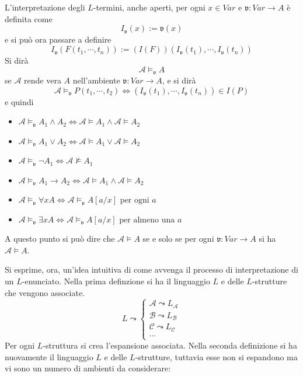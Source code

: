 \begin{defi}
        L'interpretazione degli $L$-termini, anche aperti, per ogni 
        $x \in Var$ e $\mathfrak{v} : Var \rightarrow A$ è 
        definita come 
        $$
        I_{\mathfrak{v}}(x) := \mathfrak{v}(x)
        $$
        e si può ora passare a definire 
        $$
        I_{\mathfrak{v}}(F(t_1, \cdots, t_n)) := (I(F))(I_{\mathfrak{v}}(t_1), \cdots, I_{\mathfrak{v}}(t_n))
        $$
        Si dirà
        $$
        \mathcal{A}\models_{\mathfrak{v}} A 
        $$
        se $\mathcal{A}$ rende vera $A$ nell'ambiente $\mathfrak{v}: Var \rightarrow A$, 
        e si dirà 
        $$
        \mathcal{A} \models_{\mathfrak{v}} P(t_1, \cdots, t_2) \iff (I_{\mathfrak{v}}(t_1), \cdots, I_{\mathfrak{v}}(t_n)) \in I(P)
        $$
         e quindi 

         \begin{itemize}
                 \item  $\mathcal{A} \models_{\mathfrak{v}} A_1 \land A_2 \iff \mathcal{A} \models A_1 \land \mathcal{A} \models A_2$
                 \item $\mathcal{A} \models_{\mathfrak{v}}A_1 \lor A_2 \iff \mathcal{A} \models A_1 \lor \mathcal{A} \models A_2$
                 \item $\mathcal{A} \models_{\mathfrak{v}}  \neg A_1  \iff \mathcal{A} \nvDash A_1 $
                 \item $\mathcal{A} \models_{\mathfrak{v}} A_1 \rightarrow A_2 \iff \mathcal{A} \models A_1 \land \mathcal{A} \models A_2$
                 \item $\mathcal{A} \models_{\mathfrak{v}} \forall x A \iff \mathcal{A} \models_{\mathfrak{v}} A[a/x] \text{ per ogni } a$
                 \item $\mathcal{A} \models_{\mathfrak{v}} \exists x A \iff \mathcal{A} \models_{\mathfrak{v}} A[a/x] \text{ per almeno una  } a$
        \end{itemize}
        A questo punto si  può dire che $\mathcal{A} \models A$ se e solo se 
        per ogni $\mathfrak{v}: Var \rightarrow A$ si ha $\mathcal{A} \models A$. 
\end{defi}

\noindent
Si esprime, ora, un'idea intuitiva di come avvenga il processo di interpretazione 
di un $L$-enunciato. Nella prima definzione si ha il linguaggio $L$ e delle 
$L$-strutture che vengono associate. 
$$
L 
\leadsto
\begin{cases}
        \mathcal{A}  \leadsto L_{\mathcal{A}} \\
        \mathcal{B}  \leadsto L_{\mathcal{B}} \\
        \mathcal{C}  \leadsto L_{\mathcal{C}} \\
        \cdots
\end{cases}
$$
Per ogni $L$-struttura si crea l'espansione associata. 
Nella seconda definizione si ha nuovamente il linguaggio $L$ e delle $L$-strutture, 
tuttavia esse non si espandono ma vi sono un numero di ambienti da considerare: 

